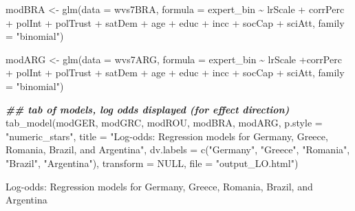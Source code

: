 \documentclass[
  12pt,
  english,
]{article}
\newenvironment{Shaded}{\begin{snugshade}}{\end{snugshade}}
\newcommand{\AttributeTok}[1]{\textcolor[rgb]{0.77,0.63,0.00}{#1}}
\newcommand{\ConstantTok}[1]{\textcolor[rgb]{0.00,0.00,0.00}{#1}}
\newcommand{\DocumentationTok}[1]{\textcolor[rgb]{0.56,0.35,0.01}{\textbf{\textit{#1}}}}
\newcommand{\FunctionTok}[1]{\textcolor[rgb]{0.00,0.00,0.00}{#1}}
\newcommand{\NormalTok}[1]{#1}
\newcommand{\OtherTok}[1]{\textcolor[rgb]{0.56,0.35,0.01}{#1}}
\newcommand{\SpecialCharTok}[1]{\textcolor[rgb]{0.00,0.00,0.00}{#1}}
\newcommand{\StringTok}[1]{\textcolor[rgb]{0.31,0.60,0.02}{#1}}
\begin{document}
\begin{Shaded}
\begin{Highlighting}[]
\NormalTok{modBRA }\OtherTok{\textless{}{-}} \FunctionTok{glm}\NormalTok{(}\AttributeTok{data =}\NormalTok{ wvs7BRA, }\AttributeTok{formula =}\NormalTok{ expert\_bin }\SpecialCharTok{\textasciitilde{}}\NormalTok{ lrScale }\SpecialCharTok{+}\NormalTok{ corrPerc }\SpecialCharTok{+}\NormalTok{ polInt }\SpecialCharTok{+}\NormalTok{ polTrust }\SpecialCharTok{+}
\NormalTok{                satDem }\SpecialCharTok{+}\NormalTok{ age }\SpecialCharTok{+}\NormalTok{ educ }\SpecialCharTok{+}\NormalTok{ incc }\SpecialCharTok{+}\NormalTok{ socCap }\SpecialCharTok{+}\NormalTok{ sciAtt, }\AttributeTok{family =} \StringTok{"binomial"}\NormalTok{)}

\NormalTok{modARG }\OtherTok{\textless{}{-}} \FunctionTok{glm}\NormalTok{(}\AttributeTok{data =}\NormalTok{ wvs7ARG, }\AttributeTok{formula =}\NormalTok{ expert\_bin }\SpecialCharTok{\textasciitilde{}}\NormalTok{ lrScale }\SpecialCharTok{+}\NormalTok{corrPerc }\SpecialCharTok{+}\NormalTok{ polInt }\SpecialCharTok{+}\NormalTok{ polTrust }\SpecialCharTok{+}
\NormalTok{                satDem }\SpecialCharTok{+}\NormalTok{ age }\SpecialCharTok{+}\NormalTok{ educ }\SpecialCharTok{+}\NormalTok{ incc }\SpecialCharTok{+}\NormalTok{ socCap }\SpecialCharTok{+}\NormalTok{ sciAtt, }\AttributeTok{family =} \StringTok{"binomial"}\NormalTok{)}
\end{Highlighting}
\end{Shaded}

\begin{Shaded}
\begin{Highlighting}[]
\DocumentationTok{\#\# tab of models, log odds displayed (for effect direction)}
\FunctionTok{tab\_model}\NormalTok{(modGER, modGRC, modROU, modBRA, modARG, }\AttributeTok{p.style =} \StringTok{"numeric\_stars"}\NormalTok{,}
          \AttributeTok{title =} \StringTok{"Log{-}odds: Regression models for Germany, Greece, Romania, Brazil, and Argentina"}\NormalTok{,}
          \AttributeTok{dv.labels =} \FunctionTok{c}\NormalTok{(}\StringTok{"Germany"}\NormalTok{, }\StringTok{"Greece"}\NormalTok{, }\StringTok{"Romania"}\NormalTok{, }\StringTok{"Brazil"}\NormalTok{, }\StringTok{"Argentina"}\NormalTok{),}
          \AttributeTok{transform =} \ConstantTok{NULL}\NormalTok{,}
          \AttributeTok{file =} \StringTok{"output\_LO.html"}\NormalTok{)}
\end{Highlighting}
\end{Shaded}

Log-odds: Regression models for Germany, Greece, Romania, Brazil, and
Argentina
\end{document}
